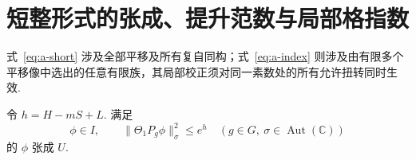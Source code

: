\section{短整形式的张成、提升范数与局部格指数}
\label{sec:a-conclusions}

式~\eqref{eq:a-short} 涉及全部平移及所有复自同构；式~\eqref{eq:a-index} 则涉及由有限多个平移像中选出的任意有限族，其局部校正须对同一素数处的所有允许扭转同时生效.

\begin{theorem}[A(a)：分歧源空间的张成与提升平方范数上界]
\label{thm:short-forms}
\emitthmsource
令 $h=H-mS+L$. 满足
\begin{equation}
  \phi\in I,\qquad
  \|\Theta_1P_g\phi\|_\sigma^2\le e^h
  \quad (g\in G,\ \sigma\in\operatorname{Aut}(\mathbb C))
\label{eq:a-short}
\end{equation}
的 $\phi$ 张成 $U$.
\end{theorem}

